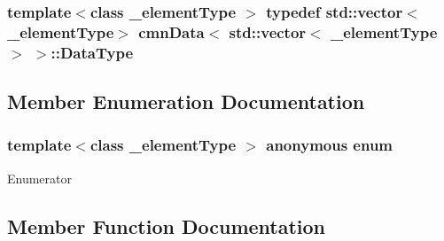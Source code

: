 \subsubsection[{Data\+Type}]{\setlength{\rightskip}{0pt plus 5cm}template$<$class \+\_\+element\+Type $>$ typedef std\+::vector$<$\+\_\+element\+Type$>$ {\bf cmn\+Data}$<$ std\+::vector$<$ \+\_\+element\+Type $>$ $>$\+::{\bf Data\+Type}}\label{classcmn_data_3_01std_1_1vector_3_01__element_type_01_4_01_4_a7a5332ebd12138b5f6d8b856cd3fdfd5}


\subsection{Member Enumeration Documentation}
\hypertarget{classcmn_data_3_01std_1_1vector_3_01__element_type_01_4_01_4_ab0e90a24bd0f203a42883aad293d0152}{}\subsubsection[{anonymous enum}]{\setlength{\rightskip}{0pt plus 5cm}template$<$class \+\_\+element\+Type $>$ anonymous enum}\label{classcmn_data_3_01std_1_1vector_3_01__element_type_01_4_01_4_ab0e90a24bd0f203a42883aad293d0152}
\begin{Desc}
\item[Enumerator]\par
\begin{description}
\item[{\em 
\hypertarget{classcmn_data_3_01std_1_1vector_3_01__element_type_01_4_01_4_ab0e90a24bd0f203a42883aad293d0152a612b4ed351eb8bd9c41c9a9da196fbe8}{}I\+S\+\_\+\+S\+P\+E\+C\+I\+A\+L\+I\+Z\+E\+D\label{classcmn_data_3_01std_1_1vector_3_01__element_type_01_4_01_4_ab0e90a24bd0f203a42883aad293d0152a612b4ed351eb8bd9c41c9a9da196fbe8}
}]\end{description}
\end{Desc}


\subsection{Member Function Documentation}
\hypertarget{classcmn_data_3_01std_1_1vector_3_01__element_type_01_4_01_4_ae453c8bec96e236e157e30ef793f1deb}{}
